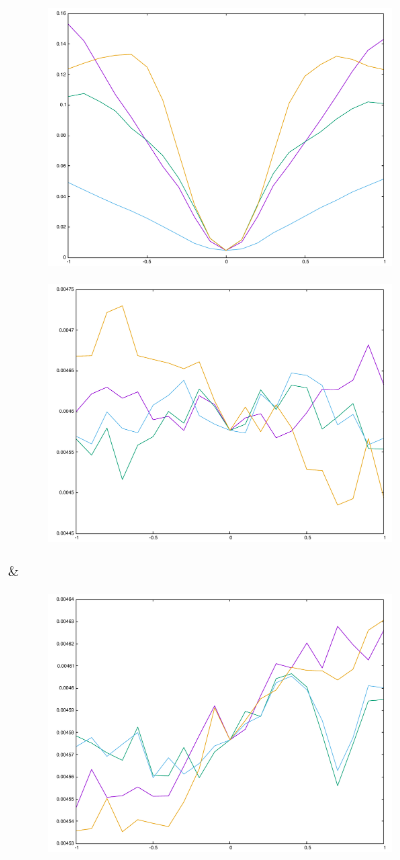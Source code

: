 {\begin{figure}[H]
\begin{subfigure}{.33\textwidth}
	\includegraphics[width=\linewidth]{fig/ajherr/t3r/L_chi.pdf}
\end{subfigure}%
\begin{subfigure}{.33\textwidth}
	\includegraphics[width=\linewidth]{fig/ajherr/t3r/M_chi.pdf}
\end{subfigure}&
\begin{subfigure}{.33\textwidth}
	\includegraphics[width=\linewidth]{fig/ajherr/t3r/S_chi.pdf}

\end{subfigure}
\end{figure}}
